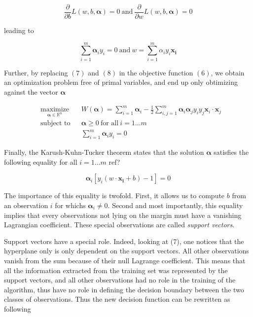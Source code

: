 \begin{equation}
  \frac{\partial}{\partial b}L(w, b, \boldsymbol{\alpha}) = 0
  \ \text{and}\ 
  \frac{\partial}{\partial w}L(w, b, \boldsymbol{\alpha}) = 0
\end{equation}

leading to

\begin{equation}
  \sum^m_{i=1} \boldsymbol{\alpha}_iy_i = 0
  \ \text{and}\ 
  w = \sum^m_{i=1} \alpha_iy_i\mathbf{x_i}
\end{equation}

Further, by replacing $(7)$ and $(8)$ in the objective function $(6)$, we obtain an optimization problem free of primal variables, and end up only obtimizing against the vector $\boldsymbol{\alpha}$

\begin{equation}
  \begin{aligned}
    &\underset{\boldsymbol{\alpha} \in \mathbb{R}^n} {\text{maximize}}
    & & W(\boldsymbol{\alpha}) = \sum_{i=1}^m\boldsymbol{\alpha}_i - \frac{1}{2}\sum_{i,j=1}^m\boldsymbol{\alpha}_i\boldsymbol{\alpha}_jy_iy_j\mathbf{x}_i \cdot \mathbf{x}_j\\
    &\text{subject to}
    & &\boldsymbol{\alpha} \ge 0\ \text{for all}\ i = 1 \dotsc m\\
    & & &\sum^m_{i=1} \boldsymbol{\alpha}_iy_i = 0
  \end{aligned}
\end{equation}

Finally, the Karush-Kuhn-Tucker theorem states that the solution $\boldsymbol{\alpha}$ satisfies the following equality for all $i = 1\dotsc m$
\textcolor[rgb]{1,0,0}{ref?}

\begin{equation}
  \boldsymbol{\alpha}_i[y_i(w \cdot \mathbf{x_i} + b) - 1] = 0
\end{equation}

The importance of this equality is twofold. First, it allows us to compute $b$ from an observation $i$ for whichs $\boldsymbol{\alpha}_i \neq 0$. Second and most importantly, this equality implies that every observations not lying on the margin must have a vanishing Lagrangian coefficient. These special observations are called \textit{support vectors}.

Support vectors have a special role. Indeed, looking at (7), one notices that the hyperplane only is only dependent on the support vectors. All other observations vanish from the sum because of their null Lagrange coefficient. This means that all the information extracted from the training set was represented by the support vectors, and all other observations had no role in the training of the algorithm, thus have no role in defining the decision boundary between the two classes of observations. Thus the new decision function can be rewritten as following

